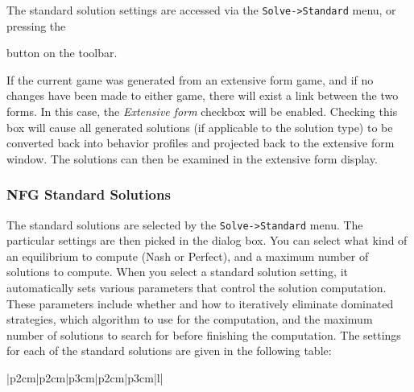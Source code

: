 {The standard solution settings are accessed via the {\tt Solve->Standard} 
menu, or pressing the 
\begin{figure}
\end{figure}
 button on the toolbar.

If the current game was generated from an extensive form game, and if no
changes have been made to either game, there will exist a link between the
two forms.  In this case, the {\em Extensive form} checkbox will be
enabled.  Checking this box will cause all generated solutions (if
applicable to the solution type) to be converted back into behavior
profiles and projected back to the extensive form window.  The solutions
can then be examined in the extensive form display.

\subsubsection{NFG Standard Solutions}\label{NFGStandardSolutions}

The standard solutions are selected by the {\tt Solve->Standard} menu.  The
particular settings are then picked in the dialog box.  You can select what kind of 
an equilibrium to compute (Nash or Perfect), 
and a maximum number of solutions to 
compute.  When you select a standard solution setting, it automatically sets various 
parameters that control the solution computation.  These parameters include 
whether and how to iteratively eliminate dominated strategies, 
which algorithm to use for the computation, and the maximum number of 
solutions to search for 
before finishing the computation.  The settings for each of the standard solutions are 
given in the following table:

\begin{tabular}{|p{2cm}|p{2cm}|p{3cm}|p{2cm}|p{3cm}|l|}
\hline
{}
\hline
{}
\hline
{}
\hline
\hline
{}
\hline
{}
\hline
{}
\hline
\end{tabular}

}
